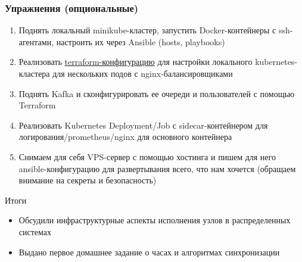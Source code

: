 \documentclass{beamer}
\begin{document}
\begin{frame}
\frametitle{Упражнения (опциональные)}

\begin{enumerate}
  \item Поднять локальный minikube-кластер, запустить Docker-контейнеры с ssh-агентами, настроить их через Ansible (hosts, playbooks)
  \item Реализовать \href{https://developer.hashicorp.com/terraform/tutorials/kubernetes/kubernetes-provider}{terraform-конфигурацию} для настройки локального kubernetes-кластера для нескольких подов с nginx-балансировщиками
  \item Поднять Kafka и сконфигурировать ее очереди и пользователей с помощью Terraform
  \item Реализовать Kubernetes Deployment/Job с sidecar-контейнером для логирования/prometheus/nginx для основного контейнера
  \item Снимаем для себя VPS-сервер с помощью хостинга и пишем для него ansible-конфигурацию для развертывания всего, что нам хочется (обращаем внимание на секреты и безопасность)
\end{enumerate}

\end{frame}

\begin{frame}{Итоги}

\begin{itemize}
\item Обсудили инфраструктурные аспекты исполнения узлов в распределенных системах
\item Выдано первое домашнее задание о часах и алгоритмах синхронизации
\end{itemize}

\end{frame}
\end{document}
